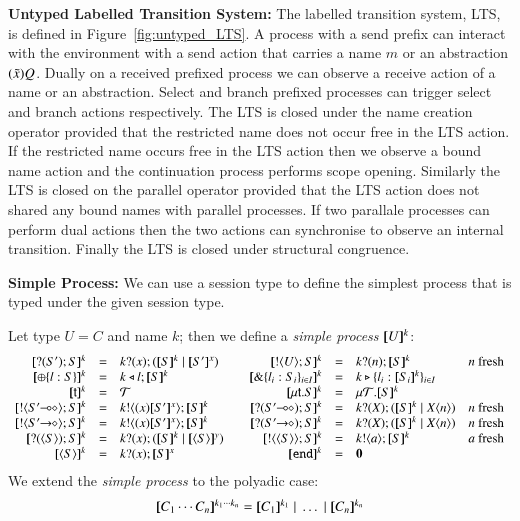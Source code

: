 

{\bf Untyped Labelled Transition System:}
The labelled transition system, LTS, is defined in Figure~\ref{fig:untyped_LTS}.
A process with a send prefix can interact with the environment with a send
action that carries a name $m$ or an abstraction $(\tilde{x})Q$. Dually
on a received prefixed process we can observe a receive action of a name or
an abstraction. Select and branch prefixed processes can trigger select
and branch actions respectively. The LTS is closed under the name creation
operator provided that the restricted name does not occur free in the LTS action.
If the restricted name occurs free in the LTS action then we observe a bound name
action and the continuation process performs scope opening. Similarly the LTS 
is closed on the parallel operator provided that the LTS action does not shared
any bound names with parallel processes. If two parallale processes can perform
dual actions then the two actions can synchronise to observe an internal transition.
Finally the LTS is closed under structural congruence.

{\bf Simple Process: }
We can use a session type to define the simplest process that is typed
under the given session type.
%
\begin{definition}\rm
	Let type $U = C$ and name $k$; then we define a {\em simple process}
	$[\!\![U]\!\!]^{k}$:
	\[
	\begin{array}{rclcrcll}
		\map{\btinp{S'} S}^{k} &=& \binp{k}{x} (\map{S}^{k} \Par \map{S'}^{x})
		&&
		\map{\btout{U} S}^{k} &=& \binp{k}{n} \map{S}^{k} & n\textrm{ fresh}
		\\

		\map{\btsel{l : S}}^{k} &=& \bsel{k}{l} \map{S}^{k}
		& &
		\map{\btbra{l_i: S_i}_{i \in I}}^{k} &=& \bbra{k}{l_i: \map{S_i}^{k}}_{i \in I}
		\\

		\map{\tvar{t}}^{k} &=& \rvar{T}
		& &
		\map{\trec{t}{S}}^{k} &=& \recp{T}{\map{S}^{k}}
		\\

		\map{\btout{\lhot{S'}} S}^{k} &=& \bout{k}{\abs{x} \map{S'}^x} \map{S}^k
		& &
		\map{\btinp{\lhot{S'}} S}^{k} &=& \binp{k}{X} (\map{S}^k \Par \appl{X}{n}) & n\textrm{ fresh}
		\\

		\map{\btout{\shot{S'}} S}^{k} &=& \bout{k}{\abs{x} \map{S'}^x} \map{S}^k
		& &
		\map{\btinp{\shot{S'}} S}^{k} &=& \binp{k}{X} (\map{S}^k \Par \appl{X}{n}) & n\textrm{ fresh}
		\\

		\map{\btinp{\chtype{S}} S}^{k} &=& \binp{k}{x} (\map{S}^k \Par \map{\chtype{S}}^y)
		&&
		\map{\btout{\chtype{S}} S}^{k} &=& \bout{k}{a} \map{S}^k  & a\textrm{ fresh}
		\\
		\map{\chtype{S}}^{k} &=& \binp{k}{x} \map{S}^x 
		&&
		\map{\tinact}^{k} &=& \inact
	\end{array}
	\]
	We extend the {\em simple process} to the polyadic case:
\[
	\begin{array}{c}
		\map{C_1 \cdots C_n}^{k_1 \cdots k_n} = \map{C_1}^{k_1} \Par \dots \Par \map{C_n}^{k_n}
	\end{array}
\]
\end{definition}

